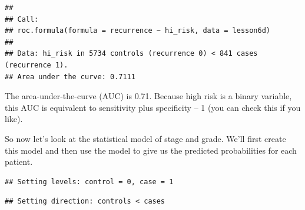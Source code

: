 \documentclass[]{book}
\newenvironment{Shaded}{\begin{snugshade}}{\end{snugshade}}
\newcommand{\CommentTok}[1]{\textcolor[rgb]{0.56,0.35,0.01}{\textit{#1}}}
\newcommand{\DataTypeTok}[1]{\textcolor[rgb]{0.13,0.29,0.53}{#1}}
\newcommand{\KeywordTok}[1]{\textcolor[rgb]{0.13,0.29,0.53}{\textbf{#1}}}
\newcommand{\NormalTok}[1]{#1}
\newcommand{\OperatorTok}[1]{\textcolor[rgb]{0.81,0.36,0.00}{\textbf{#1}}}
\newcommand{\StringTok}[1]{\textcolor[rgb]{0.31,0.60,0.02}{#1}}
\begin{document}
\begin{verbatim}
## 
## Call:
## roc.formula(formula = recurrence ~ hi_risk, data = lesson6d)
## 
## Data: hi_risk in 5734 controls (recurrence 0) < 841 cases (recurrence 1).
## Area under the curve: 0.7111
\end{verbatim}

The area-under-the-curve (AUC) is 0.71. Because high risk is a binary variable, this AUC is equivalent to sensitivity plus specificity -- 1 (you can check this if you like).

So now let's look at the statistical model of stage and grade. We'll first create this model and then use the model to give us the predicted probabilities for each patient.

\begin{Shaded}
\end{Shaded}

\begin{verbatim}
## Setting levels: control = 0, case = 1
\end{verbatim}

\begin{verbatim}
## Setting direction: controls < cases
\end{verbatim}
\end{document}
